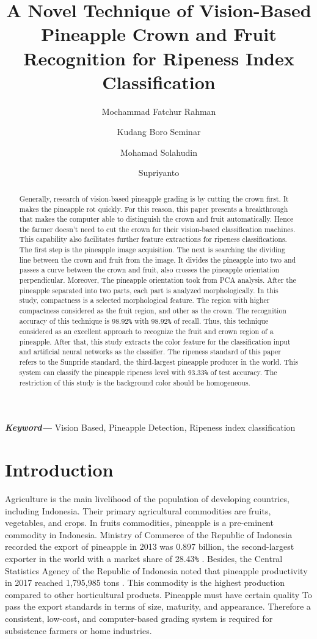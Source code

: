 \documentclass[11pt]{article}
\title{A Novel Technique of Vision-Based Pineapple Crown and Fruit Recognition for Ripeness Index Classification}
\author{Mochammad Fatchur Rahman \and
	 	Kudang Boro Seminar \and 
	 	Mohamad Solahudin \and
 		Supriyanto}
\date{}
\providecommand{\keywords}[1]{\textbf{\textit{Keyword---}} #1}
\begin{document}
\begin{linenumbers}
\maketitle
\begin{abstract}
	Generally, research of vision-based pineapple grading is by cutting the crown first. It makes the pineapple rot quickly. For this reason, this paper presents a breakthrough that makes the computer able to distinguish the crown and fruit automatically. Hence the farmer doesn't need to cut the crown for their vision-based classification machines. This capability also facilitates further feature extractions for ripeness classifications. The first step is the pineapple image acquisition. The next is searching the dividing line between the crown and fruit from the image. It divides the pineapple into two and passes a curve between the crown and fruit, also crosses the pineapple orientation perpendicular.
	Moreover, The pineapple orientation took from PCA analysis. After the pineapple separated into two parts, each part is analyzed morphologically. In this study, compactness is a selected morphological feature. The region with higher compactness considered as the fruit region, and other as the crown. The recognition accuracy of this technique is 98.92\texttt{\%} with 98.92\texttt{\%} of recall. Thus, this technique considered as an excellent approach to recognize the fruit and crown region of a pineapple. After that, this study extracts the color feature for the classification input and artificial neural networks as the classifier. The ripeness standard of this paper refers to the Sunpride standard, the third-largest pineapple producer in the world. This system can classify the pineapple ripeness level with 93.33\texttt{\%}  of test accuracy. The restriction of this study is the background color should be homogeneous.
\end{abstract}

\keywords{Vision Based, Pineapple Detection, Ripeness index classification}

\section{Introduction}

Agriculture is the main livelihood of the population of developing countries, including Indonesia. Their primary agricultural commodities are fruits, vegetables, and crops. In fruits commodities, pineapple is a pre-eminent commodity in Indonesia. Ministry of Commerce of the Republic of Indonesia recorded the export of pineapple in 2013 was 0.897 billion, the second-largest exporter in the world with a market share of 28.43\texttt {\%} \cite{pineapple-export-kemendag}. Besides, the Central Statistics Agency of the Republic of Indonesia noted that pineapple productivity in 2017 reached 1,795,985 tons \cite{BPS-website}. This commodity is the highest production compared to other horticultural products. Pineapple must have certain quality To pass the export standards in terms of size, maturity, and appearance. Therefore a consistent, low-cost, and computer-based grading system is required for subsistence farmers or home industries.


\end{linenumbers}
\end{document}
